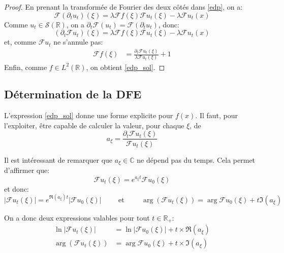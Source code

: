 \documentclass[12pt]{article}
\newcommand{\pth}[1]{\left(#1\right)}
\newcommand{\cro}[1]{\left[#1\right]}
\newcommand{\abs}[1]{\left|#1\right|}
\newcommand{\et}{\hspace{1cm}\text{et}\hspace{1cm}}
\newcommand{\ou}{\hspace{1cm}\text{ou}\hspace{1cm}}
\newcommand{\Ce}{\mathbb{C}}
\newcommand{\Er}{\mathbb{R}}
\newcommand{\Esp}[1]{\mathbb{E}\cro{#1}}
\newcommand{\dr}{\partial}
\newcommand{\fr}{\mathcal{F}}
\begin{document}
\begin{proof}
  En prenant la transformée de Fourier des deux côtés dans \eqref{edp}, on a:
\[\fr \pth{\dr_tu_t}(\xi)=\lambda \fr f(\xi)\fr {u_t}(\xi)-\lambda\fr u_t(x)\]
Comme $u_t\in \mathcal{S}(\Er)$, on a $\dr_t\fr(u_t)=\fr(\dr_tu_t)$, donc:
\[\pth{\dr_t\fr u_t}(\xi)=\lambda \fr f(\xi)\fr {u_t}(\xi)-\lambda\fr u_t(x)\]
et, comme $\fr u_t$ ne s'annule pas:
\begin{align*}
\fr f(\xi)&=\frac{\dr_t\fr u_t(\xi)}{\lambda \fr u_t(\xi)}+1
\end{align*}
Enfin, comme $f\in L^2(\Er)$, on obtient \eqref{edp_sol}.

\end{proof}


%
%
%


\subsection{Détermination de la DFE\label{ss:det_dfe}}

L'expression \eqref{edp_sol} donne une forme explicite pour $f(x)$. Il faut, pour l'exploiter, être capable de calculer la valeur, pour chaque $\xi$, de
\[a_{\xi}=\frac{\dr_t\fr u_t(\xi)}{\fr u_t(\xi)}\]

Il est intéressant de remarquer que $a_{\xi}\in\Ce$ ne dépend pas du temps. Cela permet d'affirmer que:
\[\fr u_t(\xi)=e^{a_{\xi}t}\fr u_0(\xi)\] et donc:
\[\abs{\fr u_t(\xi)}=e^{\Re(a_{\xi})t}\abs{\fr u_0(\xi)} \et \arg\pth{\fr u_t(\xi)}=\arg{\fr u_0(\xi)}+t\Im(a_{\xi})\]

On a donc deux expressions valables pour tout $t\in \Er_+$:
\begin{align}
  \ln\abs{\fr u_t(\xi)}&=\ln\abs{\fr u_0(\xi)}+t\times\Re(a_{\xi})\label{re_a}\\
  \arg\pth{\fr u_t(\xi)}&=\arg{\fr u_0(\xi)}+t\times\Im(a_{\xi})\label{im_a}
\end{align}
\end{document}
